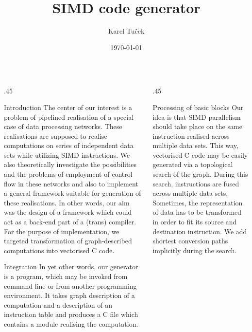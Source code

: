 \documentclass[final,hyperref={pdfpagelabels=false}]{beamer}
\title{SIMD code generator}
\author{Karel Tuček}
\institute{\ ;}
\date{\today}
\newcommand{\msp}{\vspace{1cm}}
\newcommand{\cwdh}{.45\textwidth}
\begin{document}
\begin{frame}[fragile]
  \vspace{-0.5cm}
  \begin{columns}[T]%
    \begin{column}{\cwdh}
      \msp
        \begin{block}{Introduction}
          \justify
              The center of our interest is a problem of pipelined realisation of a special case of data processing networks. These realisations are supposed to realise computations on series of independent data sets while utilizing SIMD instructions. We also theoretically investigate the possibilities and the problems of employment of control flow in these networks and also to implement a general framework suitable for generation of these realisations. In other words, our aim was the design of a framework which could act as a back-end part of a (trans) compiler. For the purpose of implementation, we targeted transformation of graph-described computations into vectorised C code.
        \end{block}

        \msp

        \begin{block}{Integration}
          \justify
            In yet other words, our generator is a program, which may be invoked from command line or from another programming environment. It takes graph description of a computation and a description of an instruction table and produces a C file which contains a module realising the computation.

            \ 

          \begin{figure}
            
          \end{figure}
             
        \end{block}


            \msp
    \end{column}

    \begin{column}{\cwdh}
      \msp
            \begin{block}{Processing of basic blocks}
              \justify
              Our idea is that SIMD parallelism should take place on the same instruction realised across multiple data sets. This way, vectorised C code may be easily generated via a topological search of the graph. During this search, instructions are fused across multiple data sets. Sometimes, the representation of data has to be transformed in order to fit its source and destination instruction. We add shortest conversion paths implicitly during the search.
            \end{block}



\end{column}
\end{columns}
\end{frame}
\end{document}
